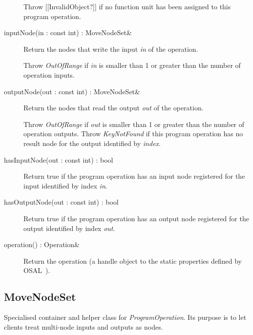 \documentclass[a4paper,twoside]{tce}
\begin{document}
\begin{description}
  Throw [[InvalidObject?]] if no function unit has been assigned to this
  program operation.

\item[inputNode(in : const int) : MoveNodeSet\&]%
  Return the nodes that write the input \emph{in} of the operation.

  Throw \emph{OutOfRange}
%
%
  if \emph{in} is smaller than 1 or greater than the number of operation
  inputs.

\item[outputNode(out : const int) : MoveNodeSet\&]%
  Return the nodes that read the output \emph{out} of the
  operation.

  Throw \emph{OutOfRange} if \emph{out} is smaller than 1 or greater than
  the number of operation outputs.
%
  Throw \emph{KeyNotFound} if this program operation has no result node for
  the output identified by \emph{index}.

\item[hasInputNode(out : const int) : bool]%
  Return true if the program operation has an input node registered for the
  input identified by index \emph{in}.

\item[hasOutputNode(out : const int) : bool]%
  Return true if the program operation has an output node registered for the
  output identified by index \emph{out}.

\item[operation() : Operation\&]%
  Return the operation (a handle object to the static properties defined by
  OSAL~\cite{OSAL-specs,OSALDesign}).
\end{description}

\subsection{MoveNodeSet}
\label{ssec:MoveNodeSet-if}

Specialised container and helper class for \emph{ProgramOperation}. Its
purpose is to let clients treat multi-node inputs and outputs as nodes.

\end{document}
